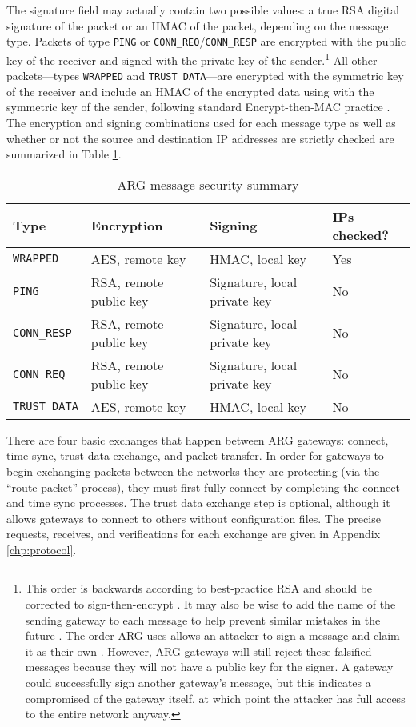 \par The signature field may actually contain two possible values: a true \ac{RSA} digital signature of the packet or an \ac{HMAC} of the packet, depending on the message type. Packets of type \texttt{PING} or \texttt{CONN\_REQ}/\texttt{CONN\_RESP} are encrypted with the public key of the receiver and signed with the private key of the sender.\footnote{This order is backwards according to best-practice \ac{RSA} and should be corrected to sign-then-encrypt \cite{RobustPrinciplesPK}. It may also be wise to add the name of the sending gateway to each message to help prevent similar mistakes in the future \cite{EngPricCrypto}. The order \ac{ARG} uses allows an attacker to sign a message and claim it as their own \cite{rfc2633}. However, \ac{ARG} gateways will still reject these falsified messages because they will not have a public key for the signer. A gateway could successfully sign another gateway's message, but this indicates a compromised of the gateway itself, at which point the attacker has full access to the entire network anyway.} All other packets---types \texttt{WRAPPED} and \texttt{TRUST\_DATA}---are encrypted with the symmetric key of the receiver and include an \ac{HMAC} of the encrypted data using with the symmetric key of the sender, following standard Encrypt-then-MAC practice \cite{AuthEncryptThenMAC}. The encryption and signing combinations used for each message type as well as whether or not the source and destination \ac{IP} addresses are strictly checked are summarized in Table \ref{tbl:arg_protocol_security}.

\begin{table}
\caption{\ac{ARG} message security summary}
\label{tbl:arg_protocol_security}
\centering
\begin{tabular}{l|l|l|l}
\textbf{Type} & \textbf{Encryption} & \textbf{Signing} & \textbf{\acp{IP} checked?}\\
\hline
\texttt{WRAPPED} & AES, remote key & HMAC, local key & Yes\\
\texttt{PING} & RSA, remote public key & Signature, local private key & No\\
\texttt{CONN\_RESP} & RSA, remote public key & Signature, local private key & No\\
\texttt{CONN\_REQ} & RSA, remote public key & Signature, local private key & No\\
\texttt{TRUST\_DATA} & AES, remote key & HMAC, local key & No\\
\end{tabular}
\end{table}

\par There are four basic exchanges that happen between \ac{ARG} gateways: connect, time sync, trust data exchange, and packet transfer. In order for gateways to begin exchanging packets between the networks they are protecting (via the ``route packet'' process), they must first fully connect by completing the connect and time sync processes. The trust data exchange step is optional, although it allows gateways to connect to others without configuration files. The precise requests, receives, and verifications for each exchange are given in Appendix \ref{chp:protocol}.

